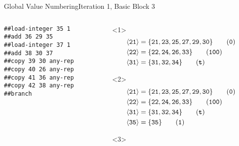 \documentclass{beamer}
\newcommand{\vn}[1]{\ensuremath{\langle\texttt{#1}\rangle}}
\newcommand{\vreg}[1]{\texttt{#1}}
\begin{document}
\begin{frame}[fragile]{Global Value Numbering}{Iteration 1, Basic Block 3}
  \footnotesize
  \begin{columns}[t,onlytextwidth]
    \begin{column}[t]{.5\textwidth}
      \begin{Verbatim}[frame=single]
##load-integer 35 1
##add 36 29 35
##load-integer 37 1
##add 38 30 37
##copy 39 30 any-rep
##copy 40 26 any-rep
##copy 41 36 any-rep
##copy 42 38 any-rep
##branch
      \end{Verbatim}
    \end{column}
    \begin{column}{.5\textwidth}
      \begin{onlyenv}<1>
        \begin{align*}
          \vn{21} &= \{\vreg{21},
                       \vreg{23},
                       \vreg{25},
                       \vreg{27},
                       \vreg{29},
                       \vreg{30}\} \tag{\texttt{0}} \\
          \vn{22} &= \{\vreg{22},
                       \vreg{24},
                       \vreg{26},
                       \vreg{33}\} \tag{\texttt{100}} \\
          \vn{31} &= \{\vreg{31},
                       \vreg{32},
                       \vreg{34}\} \tag{\texttt{\textbf{t}}}
        \end{align*}
      \end{onlyenv}
      \begin{onlyenv}<2>
        \begin{align*}
          \vn{21} &= \{\vreg{21},
                       \vreg{23},
                       \vreg{25},
                       \vreg{27},
                       \vreg{29},
                       \vreg{30}\} \tag{\texttt{0}} \\
          \vn{22} &= \{\vreg{22},
                       \vreg{24},
                       \vreg{26},
                       \vreg{33}\} \tag{\texttt{100}} \\
          \vn{31} &= \{\vreg{31},
                       \vreg{32},
                       \vreg{34}\} \tag{\texttt{\textbf{t}}} \\
          \vn{35} &= \{\vreg{35}\} \tag{\texttt{1}}
        \end{align*}
      \end{onlyenv}
      \begin{onlyenv}<3>
        \begin{align*}

\end{align*}
\end{onlyenv}
\end{column}
\end{columns}
\end{frame}
\end{document}
